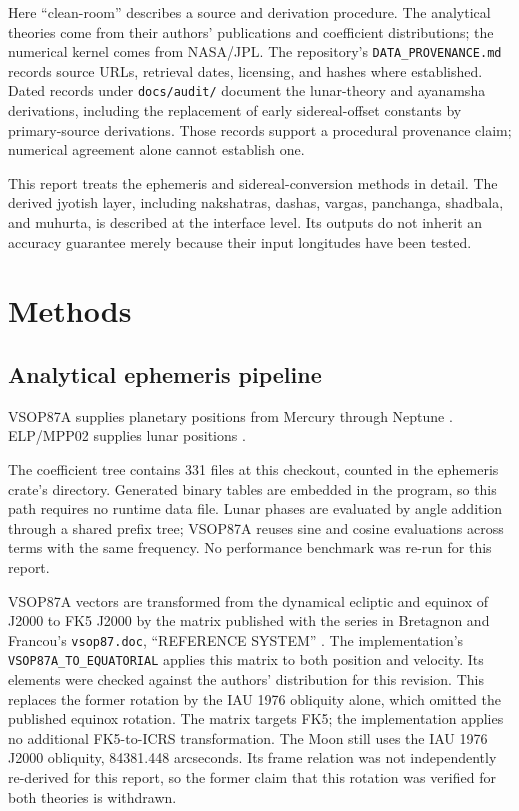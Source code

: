 \documentclass[11pt]{article}
\begin{document}
Here ``clean-room'' describes a source and derivation procedure. The analytical theories
come from their authors' publications and coefficient distributions; the numerical kernel
comes from NASA/JPL. The repository's \texttt{DATA\_PROVENANCE.md} records source URLs,
retrieval dates, licensing, and hashes where established. Dated records under
\texttt{docs/audit/} document the lunar-theory and ayanamsha derivations, including the
replacement of early sidereal-offset constants by primary-source derivations.
Those records support a procedural provenance claim; numerical agreement alone cannot
establish one.

This report treats the ephemeris and sidereal-conversion methods in detail. The derived
jyotish layer, including nakshatras, dashas, vargas, panchanga, shadbala, and muhurta, is
described at the interface level. Its outputs do not inherit an accuracy guarantee merely
because their input longitudes have been tested.

\section{Methods}

\subsection{Analytical ephemeris pipeline}

VSOP87A supplies planetary positions from Mercury through Neptune
\citep{bretagnon1988vsop87}. ELP/MPP02 supplies lunar positions
\citep{chapront2003elpmpp02}.

The coefficient tree contains 331 files at this checkout, counted in the ephemeris
crate's  directory.
Generated binary tables are embedded in the program, so this path requires no runtime
data file. Lunar phases are evaluated by angle addition through a shared prefix tree;
VSOP87A reuses sine and cosine evaluations across terms with the same frequency.
No performance benchmark was re-run for this report.

VSOP87A vectors are transformed from the dynamical ecliptic and equinox of J2000 to FK5
J2000 by the matrix published with the series in Bretagnon and Francou's
\texttt{vsop87.doc}, ``REFERENCE SYSTEM'' \citep{bretagnon1988vsop87}.
The implementation's \texttt{VSOP87A\_TO\_EQUATORIAL} applies this matrix to both position
and velocity. Its elements were checked against the authors' distribution for this revision.
This replaces the former rotation by the IAU 1976 obliquity alone, which omitted the
published equinox rotation. The matrix targets FK5; the implementation applies no additional
FK5-to-ICRS transformation. The Moon still uses the IAU 1976 J2000 obliquity,
84381.448 arcseconds. Its frame relation was not independently re-derived for this report,
so the former claim that this rotation was verified for both theories is withdrawn.
\end{document}
